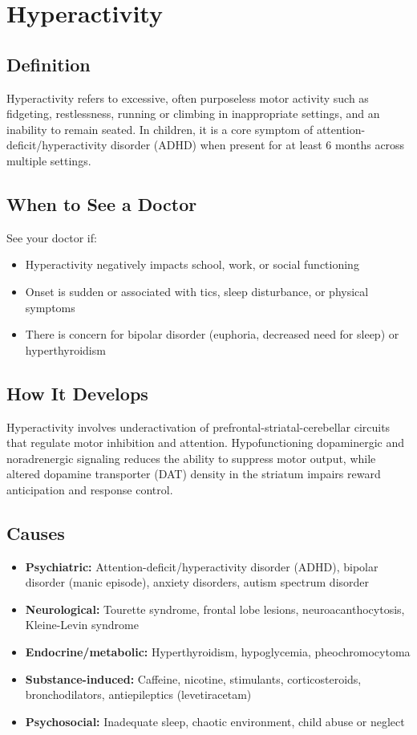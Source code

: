 \chapter{Hyperactivity}

\section*{Definition}
Hyperactivity refers to excessive, often purposeless motor activity such as fidgeting, restlessness, running or climbing in inappropriate settings, and an inability to remain seated. In children, it is a core symptom of attention-deficit/hyperactivity disorder (ADHD) when present for at least 6 months across multiple settings.

\section*{When to See a Doctor}
See your doctor if:
\begin{itemize}
  \item Hyperactivity negatively impacts school, work, or social functioning
  \item Onset is sudden or associated with tics, sleep disturbance, or physical symptoms
  \item There is concern for bipolar disorder (euphoria, decreased need for sleep) or hyperthyroidism
\end{itemize}

\section*{How It Develops}
Hyperactivity involves underactivation of prefrontal-striatal-cerebellar circuits that regulate motor inhibition and attention. Hypofunctioning dopaminergic and noradrenergic signaling reduces the ability to suppress motor output, while altered dopamine transporter (DAT) density in the striatum impairs reward anticipation and response control.

\section*{Causes}
\begin{itemize}
  \item \textbf{Psychiatric:} Attention-deficit/hyperactivity disorder (ADHD), bipolar disorder (manic episode), anxiety disorders, autism spectrum disorder
  \item \textbf{Neurological:} Tourette syndrome, frontal lobe lesions, neuroacanthocytosis, Kleine-Levin syndrome
  \item \textbf{Endocrine/metabolic:} Hyperthyroidism, hypoglycemia, pheochromocytoma
  \item \textbf{Substance-induced:} Caffeine, nicotine, stimulants, corticosteroids, bronchodilators, antiepileptics (levetiracetam)
  \item \textbf{Psychosocial:} Inadequate sleep, chaotic environment, child abuse or neglect
\end{itemize}

